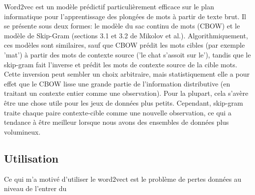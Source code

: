 Word2vec est un modèle prédictif particulièrement efficace sur le plan informatique pour l'apprentissage des plongées de mots à partir de texte brut. Il se présente sous deux formes: le modèle du sac continu de mots (CBOW) et le modèle de Skip-Gram (sections 3.1 et 3.2 de Mikolov et al.). Algorithmiquement, ces modèles sont similaires, sauf que CBOW prédit les mots cibles (par exemple 'mat') à partir des mots de contexte source ('le chat s'assoit sur le'), tandis que le skip-gram fait l'inverse et prédit les mots de contexte source de la cible mots. Cette inversion peut sembler un choix arbitraire, mais statistiquement elle a pour effet que le CBOW lisse une grande partie de l'information distributive (en traitant un contexte entier comme une observation). Pour la plupart, cela s'avère être une chose utile pour les jeux de données plus petits. Cependant, skip-gram traite chaque paire contexte-cible comme une nouvelle observation, ce qui a tendance à être meilleur lorsque nous avons des ensembles de données plus volumineux.
\subsection{Utilisation}
Ce qui m'a motivé d'utiliser le word2vect est le problème de pertes données au niveau de l'entrer du 




